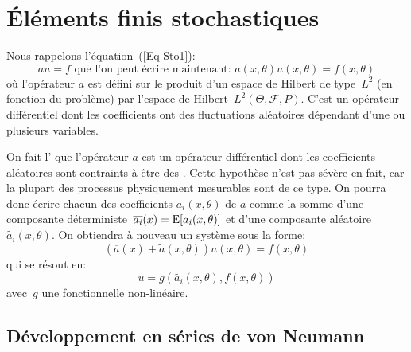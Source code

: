 \medskip
\section{Éléments finis stochastiques}

Nous rappelons l'équation~(\ref{Eq-Sto1}):
$$ au=f \text{ que l'on peut écrire maintenant: } a(x,\theta) u(x,\theta) = f(x,\theta)$$
où l'opérateur $a$ est défini sur le produit d'un espace de Hilbert de type~$L^2$ (en fonction du problème) par l'espace de Hilbert~$L^2(\Theta,\mathcal{F},P)$.
C'est un opérateur différentiel dont les coefficients ont des fluctuations aléatoires dépendant d'une ou plusieurs variables.

\medskip
On fait l' que l'opérateur $a$ est un opérateur différentiel dont les coefficients aléatoires sont contraints à être des .
Cette hypothèse n'est pas sévère en fait, car la plupart des processus physiquement mesurables sont de ce type.
On pourra donc écrire chacun des coefficients $a_i(x,\theta)$ de $a$ comme la somme d'une composante déterministe~$\overline{a_i}(x)=\operatorname{E}[a_i(x,\theta)]$ et d'une composante aléatoire~$\widetilde{a_i}(x,\theta)$.
On obtiendra à nouveau un système sous la forme:
\begin{equation}\label{Eq-Sto2}
(\overline{a}(x)+\widetilde{a}(x,\theta))u(x,\theta)=f(x,\theta)
\end{equation}
qui se résout en:
\begin{equation}
u=g(\widetilde{a_i}(x,\theta),f(x,\theta))
\end{equation}
avec~$g$ une fonctionnelle non-linéaire.

\medskip
\subsection{Développement en séries de von Neumann}

